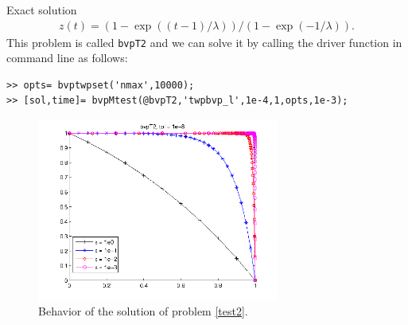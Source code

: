 \documentclass[<options>]{article}
\begin{document}
Exact solution
\begin{equation*}
\begin{matrix}
z(t) = (1 - \exp((t - 1) /\lambda)) / (1 - \exp(-1/\lambda)).
\end{matrix}
\end{equation*}
This problem is called \texttt{bvpT2} and we can solve
it by calling the driver function in command line as follows:
\begin{verbatim}
>> opts= bvptwpset('nmax',10000);
>> [sol,time]= bvpMtest(@bvpT2,'twpbvp_l',1e-4,1,opts,1e-3);
\end{verbatim}
\begin{figure}[htb]
\centerline{\includegraphics[height=6cm]{Prob2}}
\caption{Behavior of the solution of problem \ref{test2}.}
\end{figure}
\newpage
\end{document}

